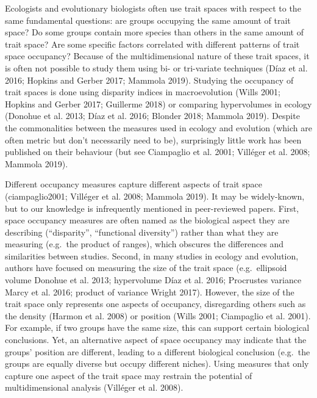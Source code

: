 \documentclass[]{article}
\begin{document}
\renewcommand\baselinestretch{1.6}\selectfont

Ecologists and evolutionary biologists often use trait spaces with
respect to the same fundamental questions: are groups occupying the same
amount of trait space? Do some groups contain more species than others
in the same amount of trait space? Are some specific factors correlated
with different patterns of trait space occupancy? Because of the
multidimensional nature of these trait spaces, it is often not possible
to study them using bi- or tri-variate techniques (Díaz et al. 2016;
Hopkins and Gerber 2017; Mammola 2019). Studying the occupancy of trait
spaces is done using disparity indices in macroevolution (Wills 2001;
Hopkins and Gerber 2017; Guillerme 2018) or comparing hypervolumes in
ecology (Donohue et al. 2013; Díaz et al. 2016; Blonder 2018; Mammola
2019). Despite the commonalities between the measures used in ecology
and evolution (which are often metric but don't necessarily need to be),
surprisingly little work has been published on their behaviour (but see
Ciampaglio et al. 2001; Villéger et al. 2008; Mammola 2019).

Different occupancy measures capture different aspects of trait space
(ciampaglio2001; Villéger et al. 2008; Mammola 2019). It may be
widely-known, but to our knowledge is infrequently mentioned in
peer-reviewed papers. First, space occupancy measures are often named as
the biological aspect they are describing (``disparity'', ``functional
diversity'') rather than what they are measuring (e.g.~the product of
ranges), which obscures the differences and similarities between
studies. Second, in many studies in ecology and evolution, authors have
focused on measuring the size of the trait space (e.g.~ellipsoid volume
Donohue et al. 2013; hypervolume Díaz et al. 2016; Procrustes variance
Marcy et al. 2016; product of variance Wright 2017). However, the size
of the trait space only represents one aspects of occupancy,
disregarding others such as the density (Harmon et al. 2008) or position
(Wills 2001; Ciampaglio et al. 2001). For example, if two groups have
the same size, this can support certain biological conclusions. Yet, an
alternative aspect of space occupancy may indicate that the groups'
position are different, leading to a different biological conclusion
(e.g.~the groups are equally diverse but occupy different niches). Using
measures that only capture one aspect of the trait space may restrain
the potential of multidimensional analysis (Villéger et al. 2008).
\end{document}
